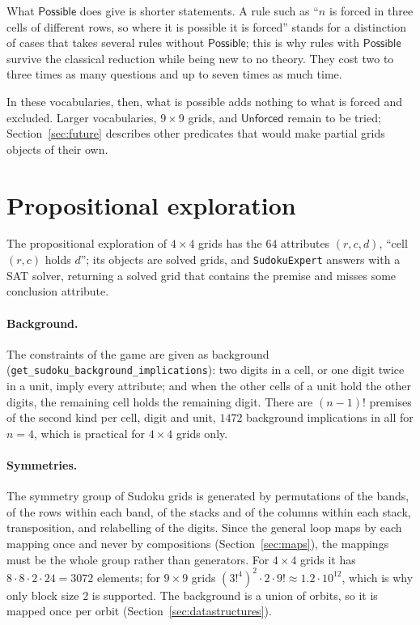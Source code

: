 \documentclass[11pt,a4paper]{article}
\theoremstyle{definition}
\theoremstyle{remark}
\newcommand{\code}[1]{\texttt{#1}}
\newcommand{\pred}[1]{\mathsf{#1}}
\begin{document}
What $\pred{Possible}$ does give is shorter statements. A rule such as ``$n$ is forced in three cells of different rows, so where it is possible it is forced'' stands for a distinction of cases that takes several rules without $\pred{Possible}$; this is why rules with $\pred{Possible}$ survive the classical reduction while being new to no theory. They cost two to three times as many questions and up to seven times as much time.

In these vocabularies, then, what is possible adds nothing to what is forced and excluded. Larger vocabularies, $9 \times 9$ grids, and $\pred{Unforced}$ remain to be tried; Section~\ref{sec:future} describes other predicates that would make partial grids objects of their own.

\section{Propositional exploration}\label{sec:propositional}

The propositional exploration of $4 \times 4$ grids has the $64$ attributes $(r, c, d)$, ``cell $(r,c)$ holds $d$''; its objects are solved grids, and \code{SudokuExpert} answers with a SAT solver, returning a solved grid that contains the premise and misses some conclusion attribute.

\paragraph{Background.} The constraints of the game are given as background (\code{get\_sudoku\_\allowbreak background\_\allowbreak implications}): two digits in a cell, or one digit twice in a unit, imply every attribute; and when the other cells of a unit hold the other digits, the remaining cell holds the remaining digit. There are $(n-1)!$ premises of the second kind per cell, digit and unit, $1472$ background implications in all for $n = 4$, which is practical for $4 \times 4$ grids only.

\paragraph{Symmetries.} The symmetry group of Sudoku grids is generated by permutations of the bands, of the rows within each band, of the stacks and of the columns within each stack, transposition, and relabelling of the digits. Since the general loop maps by each mapping once and never by compositions (Section~\ref{sec:maps}), the mappings must be the whole group rather than generators. For $4 \times 4$ grids it has $8 \cdot 8 \cdot 2 \cdot 24 = 3072$ elements; for $9 \times 9$ grids $(3!^4)^2 \cdot 2 \cdot 9! \approx 1.2 \cdot 10^{12}$, which is why only block size $2$ is supported. The background is a union of orbits, so it is mapped once per orbit (Section~\ref{sec:datastructures}).
\end{document}

